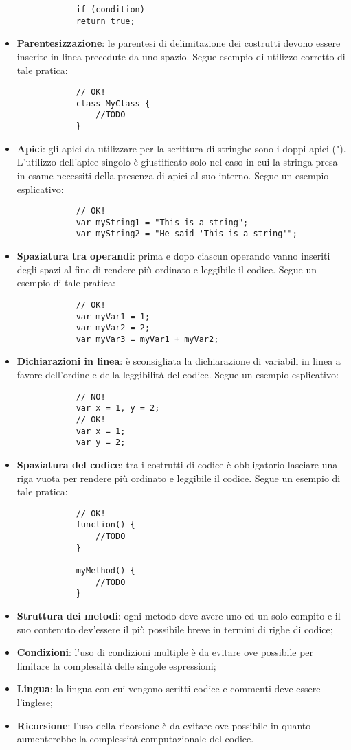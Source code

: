 \begin{itemize}
\begin{lstlisting}
			if (condition)
			return true;
			\end{lstlisting}
				\item \textbf{Parentesizzazione}: le parentesi di delimitazione dei costrutti devono essere inserite in linea precedute da uno spazio. Segue esempio di utilizzo corretto di tale pratica:
			\begin{lstlisting}
			// OK!
			class MyClass {
				//TODO
			}
			\end{lstlisting}
				\item \textbf{Apici}: gli apici da utilizzare per la scrittura di stringhe sono i doppi apici ("). L'utilizzo dell'apice singolo è giustificato solo nel caso in cui la stringa presa in esame necessiti della presenza di apici al suo interno. Segue un esempio esplicativo:
			\begin{lstlisting}
			// OK!
			var myString1 = "This is a string";
			var myString2 = "He said 'This is a string'";
			\end{lstlisting}
				\item \textbf{Spaziatura tra operandi}: prima e dopo ciascun operando vanno inseriti degli spazi al fine di rendere più ordinato e leggibile il codice. Segue un esempio di tale pratica:
			\begin{lstlisting}
			// OK!
			var myVar1 = 1;
			var myVar2 = 2;
			var myVar3 = myVar1 + myVar2;
			\end{lstlisting}
				\item \textbf{Dichiarazioni in linea}: è sconsigliata la dichiarazione di variabili in linea a favore dell'ordine e della leggibilità del codice. Segue un esempio esplicativo:
			\begin{lstlisting}
			// NO!
			var x = 1, y = 2;
			// OK!
			var x = 1;
			var y = 2;
			\end{lstlisting}
				\item \textbf{Spaziatura del codice}: tra i costrutti di codice è obbligatorio lasciare una riga vuota per rendere più ordinato e leggibile il codice. Segue un esempio di tale pratica:
			\begin{lstlisting}
			// OK!
			function() {
				//TODO
			}
			
			myMethod() {
				//TODO
			}
			\end{lstlisting}
				\item \textbf{Struttura dei metodi}: ogni metodo deve avere uno ed un solo compito e il suo contenuto dev'essere il più possibile breve in termini di righe di codice;
				\item \textbf{Condizioni}: l'uso di condizioni multiple è da evitare ove possibile per limitare la complessità delle singole espressioni;
				\item \textbf{Lingua}: la lingua con cui vengono scritti codice e commenti deve essere l'inglese;
				\item \textbf{Ricorsione}: l'uso della ricorsione è da evitare ove possibile in quanto aumenterebbe la complessità computazionale del codice.
			\end{itemize}
